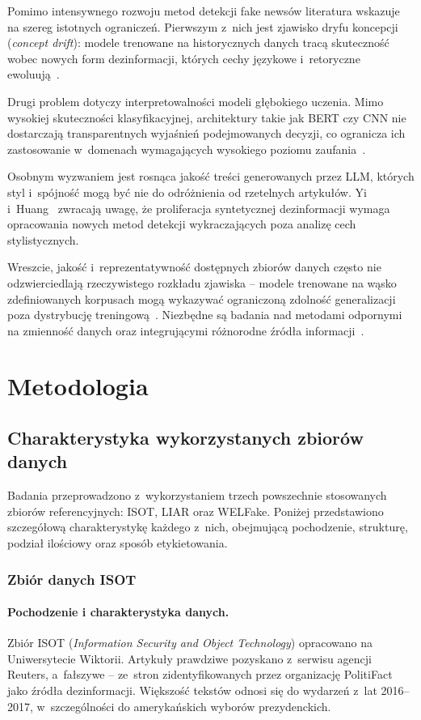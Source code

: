 \documentclass[oneside,polski,logo]{amuthesis}
\begin{document}
Pomimo intensywnego rozwoju metod detekcji fake newsów literatura wskazuje na szereg istotnych ograniczeń. Pierwszym z~nich jest zjawisko dryfu koncepcji (\textit{concept drift}): modele trenowane na historycznych danych tracą skuteczność wobec nowych form dezinformacji, których cechy językowe i~retoryczne ewoluują~\cite{Hu2025}.

Drugi problem dotyczy interpretowalności modeli głębokiego uczenia. Mimo wysokiej skuteczności klasyfikacyjnej, architektury takie jak BERT czy CNN nie dostarczają transparentnych wyjaśnień podejmowanych decyzji, co ogranicza ich zastosowanie w~domenach wymagających wysokiego poziomu zaufania~\cite{Alshuwaier2025}.

Osobnym wyzwaniem jest rosnąca jakość treści generowanych przez LLM, których styl i~spójność mogą być nie do odróżnienia od rzetelnych artykułów. Yi i~Huang~\cite{Yi2025} zwracają uwagę, że proliferacja syntetycznej dezinformacji wymaga opracowania nowych metod detekcji wykraczających poza analizę cech stylistycznych.

Wreszcie, jakość i~reprezentatywność dostępnych zbiorów danych często nie odzwierciedlają rzeczywistego rozkładu zjawiska -- modele trenowane na wąsko zdefiniowanych korpusach mogą wykazywać ograniczoną zdolność generalizacji poza dystrybucję treningową~\cite{Shu2017}. Niezbędne są badania nad metodami odpornymi na zmienność danych oraz integrującymi różnorodne źródła informacji~\cite{Teo2024}.

\chapter{Metodologia}

\section{Charakterystyka wykorzystanych zbiorów danych}

Badania przeprowadzono z~wykorzystaniem trzech powszechnie stosowanych zbiorów referencyjnych: ISOT, LIAR oraz WELFake. Poniżej przedstawiono szczegółową charakterystykę każdego z~nich, obejmującą pochodzenie, strukturę, podział ilościowy oraz sposób etykietowania.

\subsection{Zbiór danych ISOT}

\subsubsection{Pochodzenie i charakterystyka danych.} 
Zbiór ISOT (\textit{Information Security and Object Technology}) opracowano na Uniwersytecie Wiktorii. Artykuły prawdziwe pozyskano z~serwisu agencji Reuters, a~fałszywe -- ze~stron zidentyfikowanych przez organizację PolitiFact jako źródła dezinformacji. Większość tekstów odnosi się do wydarzeń z~lat 2016--2017, w~szczególności do amerykańskich wyborów prezydenckich.
\end{document}
